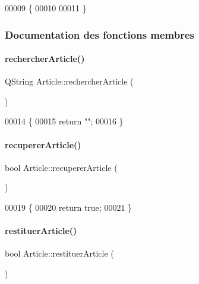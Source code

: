 \begin{DoxyCode}
00009 \{
00010 
00011 \}
\end{DoxyCode}


\subsubsection{Documentation des fonctions membres}
\mbox{\label{class_article_ad7b031dd9bd88a84006f2ff83262c42d}} 
\paragraph{\texorpdfstring{rechercher\+Article()}{rechercherArticle()}}
{\footnotesize\ttfamily Q\+String Article\+::rechercher\+Article (\begin{DoxyParamCaption}{ }\end{DoxyParamCaption})}


\begin{DoxyCode}
00014 \{
00015     \textcolor{keywordflow}{return} \textcolor{stringliteral}{""};
00016 \}
\end{DoxyCode}
\mbox{\label{class_article_a6200b67a7afe1c4e937c4087e23cdfc4}} 
\paragraph{\texorpdfstring{recuperer\+Article()}{recupererArticle()}}
{\footnotesize\ttfamily bool Article\+::recuperer\+Article (\begin{DoxyParamCaption}{ }\end{DoxyParamCaption})}


\begin{DoxyCode}
00019 \{
00020     \textcolor{keywordflow}{return} \textcolor{keyword}{true};
00021 \}
\end{DoxyCode}
\mbox{\label{class_article_acd0f9d62ff85d4254d3ca6ab87d474e2}} 
\paragraph{\texorpdfstring{restituer\+Article()}{restituerArticle()}}
{\footnotesize\ttfamily bool Article\+::restituer\+Article (\begin{DoxyParamCaption}{ }\end{DoxyParamCaption})}



